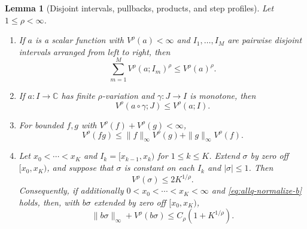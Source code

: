 \documentclass[11pt]{article}
\numberwithin{equation}{section}
\newtheorem{lemma}[theorem]{Lemma}
\theoremstyle{remark}
\theoremstyle{definition}
\begin{document}
\begin{lemma}[Disjoint intervals, pullbacks, products, and step profiles]
\label{lem:allq-calculus}
Let $1\le\rho<\infty$.

\begin{enumerate}[label=\textup{(\roman*)}]
\item If $a$ is a scalar function with $V^\rho(a)<\infty$ and
$I_1,\ldots,I_M$ are pairwise disjoint intervals arranged from left to
right, then
\begin{equation}\label{eq:allq-disjoint-var}
 \sum_{m=1}^M V^\rho(a;I_m)^\rho\le V^\rho(a)^\rho.
\end{equation}

\item If $a:I\to\mathbb C$ has finite $\rho$-variation and
$\gamma:J\to I$ is monotone, then
\begin{equation}\label{eq:allq-pullback}
 V^\rho(a\circ\gamma;J)\le V^\rho(a;I).
\end{equation}

\item For bounded $f,g$ with $V^\rho(f)+V^\rho(g)<\infty$,
\begin{equation}\label{eq:allq-product}
 V^\rho(fg)
 \le \|f\|_\infty V^\rho(g)+\|g\|_\infty V^\rho(f).
\end{equation}

\item Let $x_0<\cdots<x_K$ and
$I_k=[x_{k-1},x_k)$ for $1\le k\le K$.  Extend $\sigma$ by zero off
$[x_0,x_K)$, and suppose that $\sigma$ is constant on each $I_k$ and
$|\sigma|\le1$.  Then
\begin{equation}\label{eq:allq-step}
 V^\rho(\sigma)\le 2K^{1/\rho}.
\end{equation}
Consequently, if additionally $0<x_0<\cdots<x_K<\infty$ and
\eqref{eq:allq-normalize-b} holds, then, with $b\sigma$ extended by zero
off $[x_0,x_K)$,
\begin{equation}\label{eq:allq-b-step}
 \|b\sigma\|_\infty+V^\rho(b\sigma)
 \le C_\rho(1+K^{1/\rho}).
\end{equation}
\end{enumerate}
\end{lemma}
\end{document}
